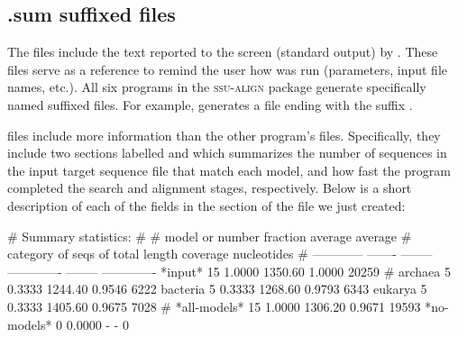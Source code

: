 \subsection{.sum suffixed files}

The  files include the text reported to the screen
(standard output) by . These files serve as a
reference to remind the user how  was run
(parameters, input file names, etc.). All six programs in the
\textsc{ssu-align} package generate specifically named 
suffixed files. For example,  generates a file ending
with the suffix .

 files include more information than the other
program's  files. Specifically, they include two sections
labelled  and  which
summarizes the number of sequences in the input target sequence file
that match each model, and how fast the program completed the search
and alignment stages, respectively. Below is a short description of
each of the fields in the  section of the
 file we just created:

\begin{sreoutput}
# Summary statistics:
#
# model or       number  fraction        average   average               
# category      of seqs  of total         length  coverage    nucleotides
# ------------  -------  --------  -------------  --------  -------------
  *input*            15    1.0000        1350.60    1.0000          20259
#
  archaea             5    0.3333        1244.40    0.9546           6222
  bacteria            5    0.3333        1268.60    0.9793           6343
  eukarya             5    0.3333        1405.60    0.9675           7028
#
  *all-models*       15    1.0000        1306.20    0.9671          19593
  *no-models*         0    0.0000              -         -              0
\end{sreoutput}

